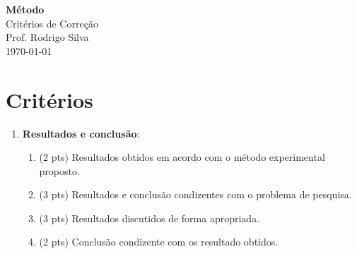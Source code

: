 \documentclass[12pt,a4paper, brazil]{article}
\begin{document}
\begin{center}
{\textbf {\huge Método}}\\[5mm]
{\large Critérios de Correção } \\[2mm]
{\large Prof. Rodrigo Silva } \\[5mm]
\today\\[5mm] %
\end{center}



\section*{Critérios}

\begin{enumerate}
    \item \textbf{Resultados e conclusão}:
        \begin{enumerate}
            \item (2 pts) Resultados obtidos em acordo com o método experimental proposto.
            \item (3 pts) Resultados e conclusão condizentes com o problema de pesquisa. 
            \item (3 pts) Resultados discutidos de forma apropriada.
            \item (2 pts) Conclusão condizente com os resultado obtidos.
        \end{enumerate}
\end{enumerate}


    


\printbibliography
\end{document}

